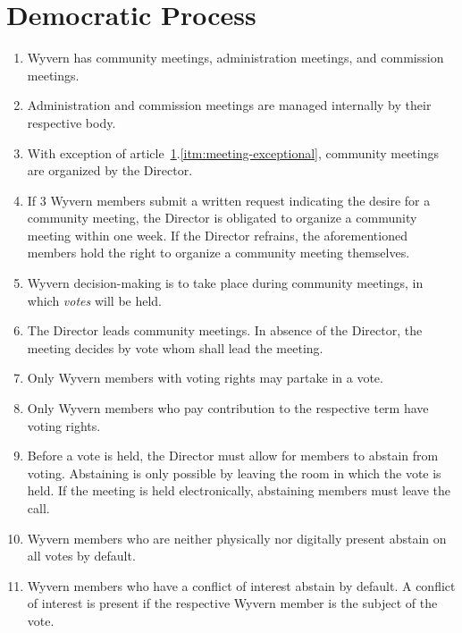 \section{Democratic Process}
\label{sec:democratic-process}
\begin{enumerate}
    \item Wyvern has community meetings, administration meetings, and commission meetings.
    
    \item Administration and commission meetings are managed internally by their respective body.

    \item With exception of article~\ref{sec:democratic-process}.\ref{itm:meeting-exceptional}, community meetings are organized by the Director.
    
    \item \label{itm:meeting-exceptional} If 3 Wyvern members submit a written request indicating the desire for a community meeting, the Director is obligated to organize a community meeting within one week. If the Director refrains, the aforementioned members hold the right to organize a community meeting themselves.

    \item Wyvern decision-making is to take place during community meetings, in which \emph{votes} will be held.
    
    \item The Director leads community meetings. In absence of the Director, the meeting decides by vote whom shall lead the meeting.

	\item Only Wyvern members with voting rights may partake in a vote.
    
    \item Only Wyvern members who pay contribution to the respective term have voting rights.

    \item Before a vote is held, the Director must allow for members to abstain from voting. Abstaining is only possible by leaving the room in which the vote is held. If the meeting is held electronically, abstaining members must leave the call.
    
    \item Wyvern members who are neither physically nor digitally present abstain on all votes by default.

    \item Wyvern members who have a conflict of interest abstain by default. A conflict of interest is present if the respective Wyvern member is the subject of the vote.


\end{enumerate}
